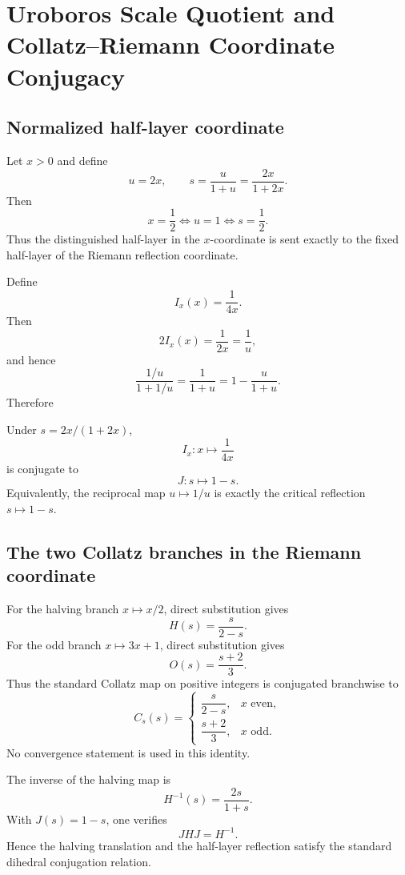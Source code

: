 \chapter{Uroboros Scale Quotient and Collatz--Riemann Coordinate Conjugacy}
\label{chap:uroboros-torus}


\section{Normalized half-layer coordinate}

Let $x>0$ and define
\[
u=2x,\qquad s=\frac{u}{1+u}=\frac{2x}{1+2x}.
\]
Then
\[
\boxed{x=\frac12\iff u=1\iff s=\frac12.}
\]
Thus the distinguished half-layer in the $x$-coordinate is sent exactly to the fixed half-layer of the Riemann reflection coordinate.

Define
\[
I_x(x)=\frac{1}{4x}.
\]
Then
\[
2I_x(x)=\frac1{2x}=\frac1u,
\]
and hence
\[
\frac{1/u}{1+1/u}=\frac1{1+u}=1-\frac{u}{1+u}.
\]
Therefore
\begin{theorem}
Under $s=2x/(1+2x)$,
\[
\boxed{I_x:x\mapsto\frac1{4x}}
\]
is conjugate to
\[
\boxed{J:s\mapsto1-s.}
\]
Equivalently, the reciprocal map $u\mapsto1/u$ is exactly the critical reflection $s\mapsto1-s$.
\end{theorem}

\section{The two Collatz branches in the Riemann coordinate}

For the halving branch $x\mapsto x/2$, direct substitution gives
\[
H(s)=\frac{s}{2-s}.
\]
For the odd branch $x\mapsto3x+1$, direct substitution gives
\[
O(s)=\frac{s+2}{3}.
\]
Thus the standard Collatz map on positive integers is conjugated branchwise to
\[
\boxed{
C_s(s)=
\begin{cases}
\dfrac{s}{2-s}, & x\text{ even},\\[0.75em]
\dfrac{s+2}{3}, & x\text{ odd}.
\end{cases}}
\]
No convergence statement is used in this identity.

The inverse of the halving map is
\[
H^{-1}(s)=\frac{2s}{1+s}.
\]
With $J(s)=1-s$, one verifies
\[
\boxed{JHJ=H^{-1}.}
\]
Hence the halving translation and the half-layer reflection satisfy the standard dihedral conjugation relation.

